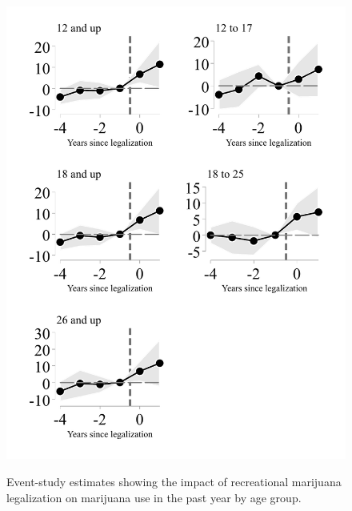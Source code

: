 \documentclass[12pt]{article}%
\begin{document}
\begin{figure}[h]
    \caption{Event-study estimates showing the impact of recreational marijuana legalization on marijuana use in the past year by age group.}
    \includegraphics[width=.75\linewidth]{../output/plots/bw-event-study-estimates-ln-mj_use_365-bw.pdf}
    \label{fig:leads-and-lags-mj-past-year}
\end{figure}
\end{document}
